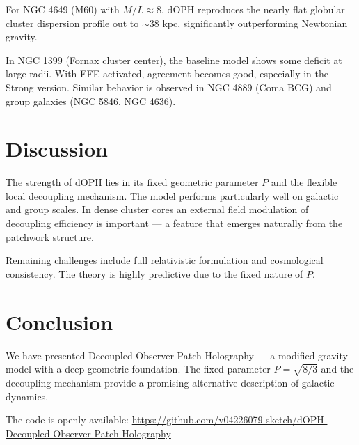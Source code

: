 \documentclass[12pt,a4paper]{article}
\begin{document}
For NGC 4649 (M60) with \(M/L \approx 8\), dOPH reproduces the nearly flat globular cluster dispersion profile out to $\sim$38 kpc, significantly outperforming Newtonian gravity.

In NGC 1399 (Fornax cluster center), the baseline model shows some deficit at large radii. With EFE activated, agreement becomes good, especially in the Strong version. Similar behavior is observed in NGC 4889 (Coma BCG) and group galaxies (NGC 5846, NGC 4636).

\section{Discussion}

The strength of dOPH lies in its fixed geometric parameter \(P\) and the flexible local decoupling mechanism. The model performs particularly well on galactic and group scales. In dense cluster cores an external field modulation of decoupling efficiency is important — a feature that emerges naturally from the patchwork structure.

Remaining challenges include full relativistic formulation and cosmological consistency. The theory is highly predictive due to the fixed nature of \(P\).

\section{Conclusion}

We have presented Decoupled Observer Patch Holography — a modified gravity model with a deep geometric foundation. The fixed parameter \(P = \sqrt{8/3}\) and the decoupling mechanism provide a promising alternative description of galactic dynamics.

The code is openly available:  
\url{https://github.com/v04226079-sketch/dOPH-Decoupled-Observer-Patch-Holography}
\end{document}
